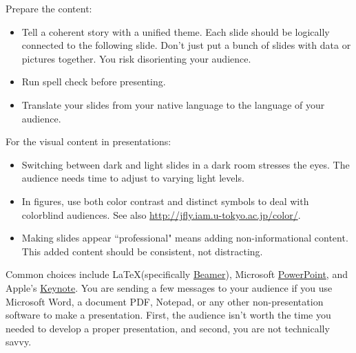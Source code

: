 
Prepare the content:
\begin{itemize}
    \item Tell a coherent story with a unified theme. Each slide should be logically connected to the following slide. Don't just put a bunch of slides with data or pictures together. You risk disorienting your audience.
    \item Run spell check before presenting.
    \item Translate your slides from your native language to the language of your audience.
\end{itemize}


For the visual content in presentations:
\begin{itemize}
    \item Switching between dark and light slides in a dark room stresses the eyes. The audience needs time to adjust to varying light levels.
    \item In figures, use both color contrast and distinct symbols to deal with colorblind audiences. See also \href{http://jfly.iam.u-tokyo.ac.jp/color/}{http://jfly.iam.u-tokyo.ac.jp/color/}.
    \item Making slides appear ``professional" means adding non-informational content. This added content should be consistent, not distracting.
\end{itemize}

Common choices include \LaTeX (specifically \href{https://en.wikipedia.org/wiki/Beamer_(LaTeX)}{Beamer}), 
\iftoggle{WPinmargin}{\marginpar{$>$Wikipedia: Beamer}}{}
Microsoft \href{https://en.wikipedia.org/wiki/Microsoft_PowerPoint}{PowerPoint}, 
and Apple's \href{https://en.wikipedia.org/wiki/Keynote_(presentation_software)}{Keynote}. 
You are sending a few messages to your audience if you use Microsoft Word, a document PDF, Notepad, or any other non-presentation software to make a presentation.
First, the audience isn't worth the time you needed to develop a proper presentation, and second, you are not technically savvy.

